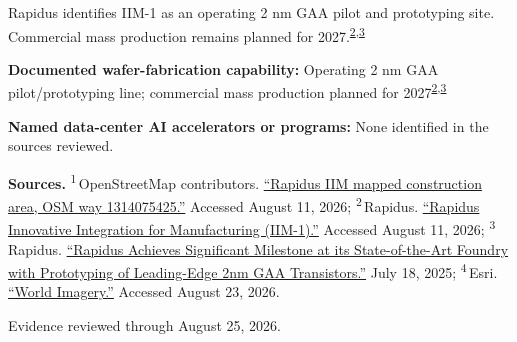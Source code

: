 \begin{minipage}[t][0.90\textheight][t]{\textwidth}
\begin{minipage}[t]{\textwidth}
\begin{minipage}[t]{0.32\textwidth}
\medskip
{\footnotesize Rapidus identifies IIM-1 as an operating 2 nm GAA pilot and prototyping site. Commercial mass production remains planned for 2027.\nobreak\textsuperscript{\href{\detokenize{https://www.rapidus.inc/en/iim/}}{\textcolor{accent}{2}},\href{\detokenize{https://www.rapidus.inc/en/news_topics/information/rapidus-achieves-significant-milestone-at-its-state-of-the-art-foundry-with-prototyping-of-leading-edge-2nm-gaa-transistors/}}{\textcolor{accent}{3}}}\par}
\medskip
{\footnotesize\textbf{Documented wafer-fabrication capability:} Operating 2 nm GAA pilot/prototyping line; commercial mass production planned for 2027\nobreak\textsuperscript{\href{\detokenize{https://www.rapidus.inc/en/iim/}}{\textcolor{accent}{2}},\href{\detokenize{https://www.rapidus.inc/en/news_topics/information/rapidus-achieves-significant-milestone-at-its-state-of-the-art-foundry-with-prototyping-of-leading-edge-2nm-gaa-transistors/}}{\textcolor{accent}{3}}}\par}
\end{minipage}
\end{minipage}
\par\vspace{0.65em}
\medskip
{\footnotesize\textbf{Named data-center AI accelerators or programs:} None identified in the sources reviewed.\par}
\medskip
{\sffamily\scriptsize\setlength{\emergencystretch}{1.5em}\textbf{Sources.} \textsuperscript{1}\,OpenStreetMap contributors. \href{\detokenize{https://www.openstreetmap.org/way/1314075425}}{\enquote{Rapidus IIM mapped construction area, OSM way 1314075425.}} Accessed August 11, 2026; \textsuperscript{2}\,Rapidus. \href{\detokenize{https://www.rapidus.inc/en/iim/}}{\enquote{Rapidus Innovative Integration for Manufacturing (IIM-1).}} Accessed August 11, 2026; \textsuperscript{3}\,Rapidus. \href{\detokenize{https://www.rapidus.inc/en/news_topics/information/rapidus-achieves-significant-milestone-at-its-state-of-the-art-foundry-with-prototyping-of-leading-edge-2nm-gaa-transistors/}}{\enquote{Rapidus Achieves Significant Milestone at its State-of-the-Art Foundry with Prototyping of Leading-Edge 2nm GAA Transistors.}} July 18, 2025; \textsuperscript{4}\,Esri. \href{\detokenize{https://www.arcgis.com/home/item.html?id=10df2279f9684e4a9f6a7f08febac2a9}}{\enquote{World Imagery.}} Accessed August 23, 2026.\par}
\vfill
\noindent{\color{hairline}\rule{\linewidth}{0.4pt}}\par\smallskip
{\sffamily\scriptsize\color{black!58} Evidence reviewed through August 25, 2026.\par}
\end{minipage}

